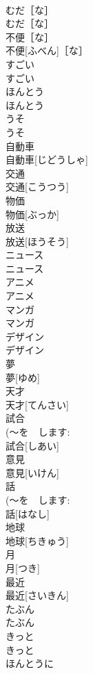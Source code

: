 \documentclass[8pt]{extreport}
\begin{document}
\begin{CJK}{UTF8}{min}
\\	むだ［な］	
\\	むだ［な］	
\\	不便［な］	
\\	不便[ふべん]［な］	
\\	すごい	
\\	すごい	
\\	ほんとう	
\\	ほんとう	
\\	うそ	
\\	うそ	
\\	自動車	
\\	自動車[じどうしゃ]	
\\	交通	
\\	交通[こうつう]	
\\	物価	
\\	物価[ぶっか]	
\\	放送	
\\	放送[ほうそう]	
\\	ニュース	
\\	ニュース	
\\	アニメ	
\\	アニメ	
\\	マンガ	
\\	マンガ	
\\	デザイン	
\\	デザイン	
\\	夢	
\\	夢[ゆめ]	
\\	天才	
\\	天才[てんさい]	
\\	試合	
\\	(～を　します: 
\\	試合[しあい]	
\\	意見	
\\	意見[いけん]	
\\	話	
\\	(～を　します: 
\\	話[はなし]	
\\	地球	
\\	地球[ちきゅう]	
\\	月	
\\	月[つき]	
\\	最近	
\\	最近[さいきん]	
\\	たぶん	
\\	たぶん	
\\	きっと	
\\	きっと	
\\	ほんとうに	

\end{CJK}
\end{document}
